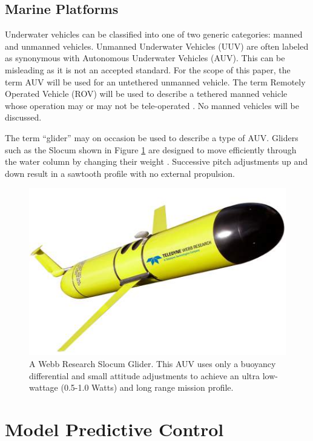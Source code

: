 \documentclass[conference]{IEEEtran}
\begin{document}
\subsection{Marine Platforms}
Underwater vehicles can be classified into one of two generic categories: manned and unmanned vehicles. Unmanned Underwater Vehicles (UUV) are often labeled as synonymous with Autonomous Underwater Vehicles (AUV). This can be misleading as it is not an accepted standard. For the scope of this paper, the term AUV will be used for an untethered unmanned vehicle. The term Remotely Operated Vehicle (ROV) will be used to describe a tethered manned vehicle whose operation may or may not be tele-operated \cite{ROV}. No manned vehicles will be discussed.

The term ``glider'' may on occasion be used to describe a type of AUV. Gliders such as the Slocum shown in Figure \ref{fig:slocum} are designed to move efficiently through the water column by changing their weight \cite{bachmayer}. Successive pitch adjustments up and down result in a sawtooth profile with no external propulsion.

\begin{figure}[h]
\includegraphics[width=0.95\columnwidth]{slocum}
\centering
\caption{A Webb Research Slocum Glider. This AUV uses only a buoyancy differential and small attitude adjustments to achieve an ultra low-wattage (0.5-1.0 Watts) and long range mission profile.}
\centering
\label{fig:slocum}
\end{figure}

\section{Model Predictive Control} \label{sec:related}
\end{document}
